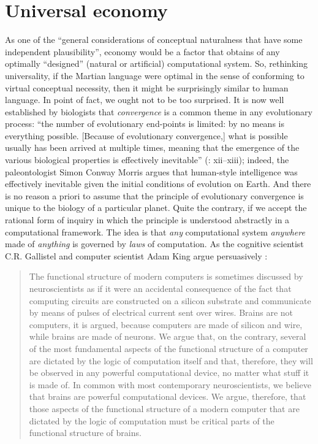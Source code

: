 \documentclass[output=paper]{langsci/langscibook}
\begin{document}
\section{Universal economy}

\largerpage
As one of the “general considerations of conceptual naturalness that have some
independent plausibility”, economy would be a factor that obtains of any
optimally “designed” (natural or artificial) computational system. So,
rethinking universality, if the Martian language were optimal in the sense of
conforming to virtual conceptual necessity, then it might be surprisingly
similar to human language. In point of fact, we ought not to be too surprised.
It is now well established by biologists that \emph{convergence} is a common
theme in any evolutionary process: “the number of evolutionary end-points is
limited: by no means is everything possible. [Because of evolutionary
convergence,] what is possible usually has been arrived at multiple times,
meaning that the emergence of the various biological properties is effectively
inevitable” (\citealt{ConwayMorris2013}: xii--xiii); indeed, the paleontologist
Simon Conway Morris argues that human-style intelligence was effectively
inevitable given the initial conditions of evolution on Earth. And there is no
reason a priori to assume that the principle of evolutionary
convergence is unique to the biology of a particular planet. Quite the
contrary, if we accept the rational form of inquiry in which the principle is
understood abstractly in a computational framework. The idea is that \emph{any}
computational system \emph{anywhere} made of \emph{anything} is governed by
\emph{laws} of computation. As the cognitive scientist C.R. Gallistel and
computer scientist Adam King argue persuasively
\parencite[167]{GallistelKing2010}:

\begin{quote}The functional structure of modern computers is sometimes discussed by
neuroscientists as if it were an accidental consequence of the fact that
computing circuits are constructed on a silicon substrate and communicate by
means of pulses of electrical current sent over wires. Brains are not
computers, it is argued, because computers are made of silicon and wire, while
brains are made of neurons. We argue that, on the contrary, several of the most
fundamental aspects of the functional structure of a computer are dictated by
the logic of computation itself and that, therefore, they will be observed in
any powerful computational device, no matter what stuff it is made of. In
common with most contemporary neuroscientists, we believe that brains are
powerful computational devices. We argue, therefore, that those aspects of the
functional structure of a modern computer that are dictated by the logic of
computation must be critical parts of the functional structure of brains.\hfill%
\hbox{\parencite[167]{GallistelKing2010}}
\end{quote}
\end{document}
